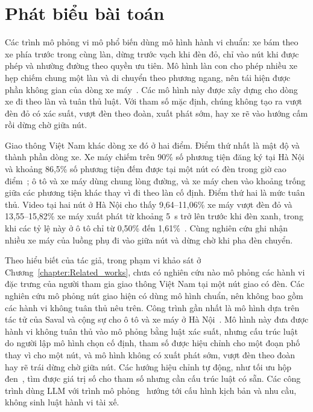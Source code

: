 \documentclass[../main.tex]{subfiles}
\begin{document}
\section{Phát biểu bài toán}
\label{section:1.current}

Các trình mô phỏng vi mô phổ biến dùng mô hình hành vi chuẩn: xe bám theo xe phía trước trong cùng làn, dừng trước vạch khi đèn đỏ, chỉ vào nút khi được phép và nhường đường theo quyền ưu tiên. Mô hình làn con cho phép nhiều xe hẹp chiếm chung một làn và di chuyển theo phương ngang, nên tái hiện được phần không gian của dòng xe máy~\cite{semrau2016chinese}. Các mô hình này được xây dựng cho dòng xe đi theo làn và tuân thủ luật. Với tham số mặc định, chúng không tạo ra vượt đèn đỏ có xác suất, vượt đèn theo đoàn, xuất phát sớm, hay xe rẽ vào hướng cấm rồi dừng chờ giữa nút.

Giao thông Việt Nam khác dòng xe đó ở hai điểm. Điểm thứ nhất là mật độ và thành phần dòng xe. Xe máy chiếm trên 90\% số phương tiện đăng ký tại Hà Nội~\cite{nguyen2022motorcycles} và khoảng 86,5\% số phương tiện đếm được tại một nút có đèn trong giờ cao điểm~\cite{mai2019signal}; ô tô và xe máy dùng chung lòng đường, và xe máy chen vào khoảng trống giữa các phương tiện khác thay vì đi theo làn cố định. Điểm thứ hai là mức tuân thủ. Video tại hai nút ở Hà Nội cho thấy 9,64--11,06\% xe máy vượt đèn đỏ và 13,55--15,82\% xe máy xuất phát từ khoảng 5~s trở lên trước khi đèn xanh, trong khi các tỷ lệ này ở ô tô chỉ từ 0,50\% đến 1,61\%~\cite{mai2019signal}. Cùng nghiên cứu ghi nhận nhiều xe máy của luồng phụ đi vào giữa nút và dừng chờ khi pha đèn chuyển.

Theo hiểu biết của tác giả, trong phạm vi khảo sát ở Chương~\ref{chapter:Related_works}, chưa có nghiên cứu nào mô phỏng các hành vi đặc trưng của người tham gia giao thông Việt Nam tại một nút giao có đèn. Các nghiên cứu mô phỏng nút giao hiện có dùng mô hình chuẩn, nên không bao gồm các hành vi không tuân thủ nêu trên. Công trình gần nhất là mô hình dựa trên tác tử của Saval và cộng sự cho ô tô và xe máy ở Hà Nội~\cite{saval2023mixed}. Mô hình này đưa được hành vi không tuân thủ vào mô phỏng bằng luật xác suất, nhưng cấu trúc luật do người lập mô hình chọn cố định, tham số được hiệu chỉnh cho một đoạn phố thay vì cho một nút, và mô hình không có xuất phát sớm, vượt đèn theo đoàn hay rẽ trái dừng chờ giữa nút. Các hướng hiệu chỉnh tự động, như tối ưu hộp đen~\cite{akiba2019optuna}, tìm được giá trị số cho tham số nhưng cần cấu trúc luật có sẵn. Các công trình dùng LLM với trình mô phỏng~\cite{jeong2025agentsumo,li2026chatsumo} hướng tới cấu hình kịch bản và nhu cầu, không sinh luật hành vi tài xế.
\end{document}
